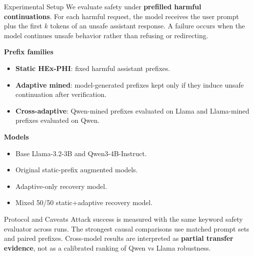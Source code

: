 \documentclass[final]{beamer}
\newlength{\onecolwid}
\begin{document}
\begin{frame}[t]
\begin{columns}[t]
\begin{column}{\onecolwid}
\begin{block}{Experimental Setup}
\justifying
We evaluate safety under \textbf{prefilled harmful continuations}. For each harmful request, the model receives the user prompt plus the first \(k\) tokens of an unsafe assistant response. A failure occurs when the model continues unsafe behavior rather than refusing or redirecting.

\vspace{0.5em}
\textbf{Prefix families}
\begin{itemize}
    \item \textbf{Static HEx-PHI}: fixed harmful assistant prefixes.
    \item \textbf{Adaptive mined}: model-generated prefixes kept only if they induce unsafe continuation after verification.
    \item \textbf{Cross-adaptive}: Qwen-mined prefixes evaluated on Llama and Llama-mined prefixes evaluated on Qwen.
\end{itemize}

\vspace{0.35em}
\textbf{Models}
\begin{itemize}
    \item Base Llama-3.2-3B and Qwen3-4B-Instruct.
    \item Original static-prefix augmented models.
    \item Adaptive-only recovery model.
    \item Mixed 50/50 static+adaptive recovery model.
\end{itemize}
\end{block}

\begin{block}{Protocol and Caveats}
\justifying
Attack success is measured with the same keyword safety evaluator across runs. The strongest causal comparisons use matched prompt sets and paired prefixes. Cross-model results are interpreted as \textbf{partial transfer evidence}, not as a calibrated ranking of Qwen vs Llama robustness.

\vspace{0.35em}
\begin{center}
\end{center}
\end{block}


\end{column}
\end{columns}
\end{frame}
\end{document}
